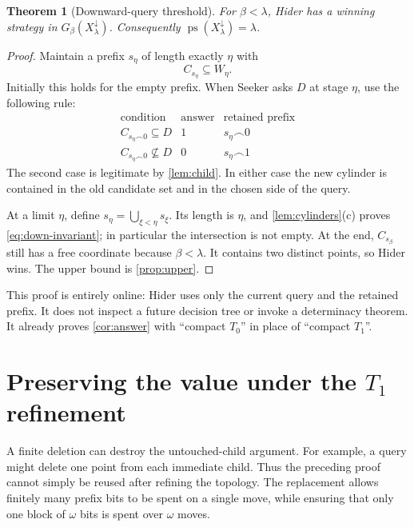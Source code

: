 \documentclass[11pt,a4paper]{article}
\newtheorem{theorem}{Theorem}[section]
\theoremstyle{definition}
\theoremstyle{remark}
\newcommand{\ps}{\operatorname{ps}}
\newcommand{\dd}{\downarrow}
\newcommand{\cat}{\mathbin{\frown}}
\begin{document}
\begin{theorem}[Downward-query threshold]\label{thm:down-exact}
For $\beta<\lambda$, Hider has a winning strategy in
$G_\beta(X_\lambda^\dd)$. Consequently $\ps(X_\lambda^\dd)=\lambda$.
\end{theorem}
\begin{proof}
Maintain a prefix $s_\eta$ of length exactly $\eta$ with
\begin{equation}\label{eq:down-invariant}
                            C_{s_\eta}\subseteq W_\eta.
\end{equation}
Initially this holds for the empty prefix. When Seeker asks $D$ at stage $\eta$,
use the following rule:
\[
 \begin{array}{c|c|c}
 \text{condition}&\text{answer}&\text{retained prefix}\\\hline
 C_{s_\eta\cat0}\subseteq D&1&s_\eta\cat0\\
 C_{s_\eta\cat0}\nsubseteq D&0&s_\eta\cat1
 \end{array}
\]
The second case is legitimate by \cref{lem:child}. In either case the new
cylinder is contained in the old candidate set and in the chosen side of the
query.

At a limit $\eta$, define $s_\eta=\bigcup_{\xi<\eta}s_\xi$.
Its length is $\eta$, and \cref{lem:cylinders}(c) proves
\eqref{eq:down-invariant}; in particular the intersection is not empty.
At the end, $C_{s_\beta}$ still has a free coordinate because $\beta<\lambda$.
It contains two distinct points, so Hider wins. The upper bound is
\cref{prop:upper}.
\end{proof}

This proof is entirely online: Hider uses only the current query and the
retained prefix. It does not inspect a future decision tree or invoke a
determinacy theorem. It already proves \cref{cor:answer} with ``compact $T_0$''
in place of ``compact $T_1$''.

\section{Preserving the value under the \texorpdfstring{$T_1$}{T1} refinement}

A finite deletion can destroy the untouched-child argument. For example, a
query might delete one point from each immediate child. Thus the preceding
proof cannot simply be reused after refining the topology. The replacement
allows finitely many prefix bits to be spent on a single move, while ensuring
that only one block of $\omega$ bits is spent over $\omega$ moves.
\end{document}
